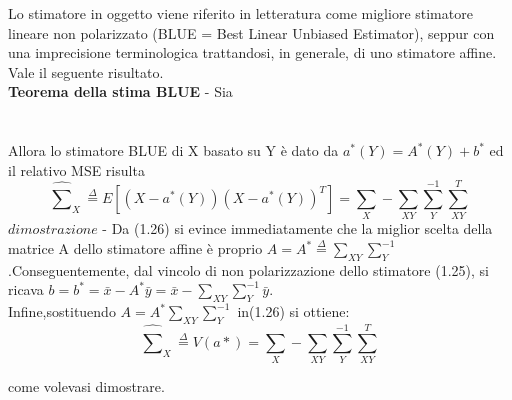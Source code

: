 Lo stimatore in oggetto viene riferito in letteratura come migliore stimatore lineare non polarizzato (BLUE = Best Linear Unbiased Estimator), seppur con una imprecisione terminologica trattandosi, in generale, di uno stimatore affine. Vale il seguente risultato.\\
\textbf{Teorema della stima BLUE} - Sia\\\\\\
Allora lo stimatore BLUE di X basato su Y è dato da $a^*(Y)=A^*(Y)+b^* $
ed il relativo MSE risulta\\
\begin{equation}
\widehat{\sum}_X\stackrel{\Delta}{=}E[(X-a^*(Y))(X-a^*(Y))^T]=\sum_X-\sum_{XY}\sum_Y^{-1}\sum_{XY}^T \nonumber
\end{equation}
$dimostrazione$ - Da (1.26) si evince immediatamente che la miglior scelta della matrice A
dello stimatore affine è proprio $A=A^*\stackrel{\Delta}{=}\sum_{XY}\sum_Y^{-1}$.Conseguentemente, dal vincolo di non
polarizzazione dello stimatore (1.25), si ricava $b=b^*=\bar{x}-A^*\bar{y}=\bar{x}-\sum_{XY}\sum_Y^{-1}\bar{y}$.\\
Infine,sostituendo $A=A^* \sum_{XY}\sum_Y^{-1}$ in(1.26) si ottiene:
\begin{equation}
\widehat{\sum}_X\stackrel{\Delta}{=}V(a*)=\sum_X-\sum_{XY}\sum_Y^{-1}\sum_{XY}^T \nonumber
\end{equation}

come volevasi dimostrare.
\newpage